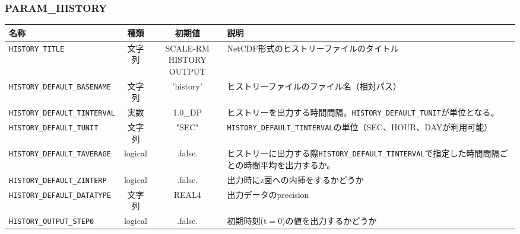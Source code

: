 \subsubsection{PARAM\_HISTORY}
\begin{tabularx}{150mm}{|l|c|c|X|} \hline
 \rowcolor[gray]{0.9} 名称 & 種類 & 初期値 & 説明 \\ \hline
 \verb|HISTORY_TITLE| & 文字列 & \shortstack{SCALE-RM \\ HISTORY OUTPUT} & NetCDF形式のヒストリーファイルのタイトル \\ \hline
 \verb|HISTORY_DEFAULT_BASENAME| & 文字列 & 'history' & ヒストリーファイルのファイル名（相対パス） \\ \hline
 \verb|HISTORY_DEFAULT_TINTERVAL| & 実数 & 1.0\_DP & ヒストリーを出力する時間間隔。\verb|HISTORY_DEFAULT_TUNIT|が単位となる。 \\ \hline
 \verb|HISTORY_DEFAULT_TUNIT| & 文字列 & "SEC" & \verb|HISTORY_DEFAULT_TINTERVAL|の単位（SEC、HOUR、DAYが利用可能） \\ \hline
 \verb|HISTORY_DEFAULT_TAVERAGE| & logical & .false. & ヒストリーに出力する際\verb|HISTORY_DEFAULT_TINTERVAL|で指定した時間間隔ごとの時間平均を出力するか。 \\ \hline
 \verb|HISTORY_DEFAULT_ZINTERP| & logical & .false. & 出力時にz面への内挿をするかどうか \\ \hline
 \verb|HISTORY_DEFAULT_DATATYPE| & 文字列 & REAL4 & 出力データのprecision \\ \hline
 \verb|HISTORY_OUTPUT_STEP0| & logical & .false. & 初期時刻(t$=$0)の値を出力するかどうか \\ \hline
\end{tabularx}


